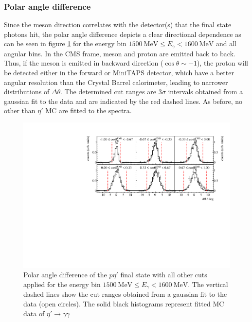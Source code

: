  \subsubsection{Polar angle difference}
 Since the meson direction correlates with the detector(s) that the final state photons hit, the polar angle difference depicts a clear directional dependence as can be seen in figure \ref{fig:pol} for the energy bin $\SI{1500}{\mega\eV}\leq E_\gamma<\SI{1600}{\mega\eV}$ and all angular bins. In the CMS frame, meson and proton are emitted back to back. Thus, if the meson is emitted in backward direction ($\cos\theta\sim -1$), the proton will be detected either in the forward or MiniTAPS detector, which have a better angular resolution than the Crystal Barrel calorimeter, leading to narrower distributions of $\Delta\theta$. The determined cut ranges are $3\sigma$ intervals obtained from a gaussian fit to the data and are indicated by the red dashed lines. As before, no other than $\eta'$ MC are fitted to the spectra.
  \begin{figure}[htbp]
 	\centering
 	\includegraphics[width=\linewidth]{../figs/hydrogen/bin_cuts/thetacut_ebin1.pdf}
 	\caption{Polar angle difference of the $p\eta'$ final state with all other cuts applied for the energy bin $\SI{1500}{\mega\eV}\leq E_\gamma<\SI{1600}{\mega\eV}$. The vertical dashed lines show the cut ranges obtained from a gaussian fit to the data (open circles). The solid black histograms represent fitted MC data of $\eta'\to\gamma\gamma$}
 	\label{fig:pol}
 \end{figure}
